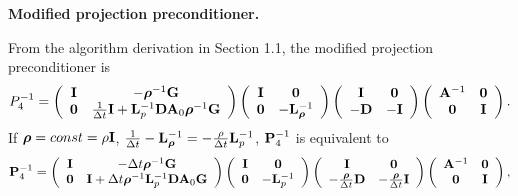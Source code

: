 \documentclass[9pt]{article}
\newcommand{\V}[1]{\boldsymbol{#1}}
\begin{document}
{\bf Modified projection preconditioner.}

From the algorithm derivation in Section 1.1, the modified projection preconditioner is
\begin{equation}\label{P4_variable_density}
P_4^{-1}=\left(\begin{array}{cc}
{\bf I} & - {\V{\rho}}^{-1}{\bf G} \\
{\bf 0}      & \frac{1}{\Delta t}{\bf I}+{\bf L}_p^{-1} {\bf D} {\bf A}_0 {\V{\rho}}^{-1} {\bf G}
\end{array}\right)
\left(\begin{array}{cc}
{\bf I}     &  {\bf 0} \\
{\bf 0}     &  -{\bf L}_{\V{\rho}}^{-1}
\end{array}\right)
\left(\begin{array}{cc}
{\bf I}      &  {\bf 0} \\
-{\bf D}     &  -{\bf I}
\end{array}\right)
\left(\begin{array}{cc}
{\bf A}^{-1}       & {\bf 0} \\
{\bf 0}            & {\bf I}
\end{array}\right).
\end{equation}
If ${\V{\rho}}=const=\rho {\bf I}$,  $\frac{1}{\Delta t} -{\bf L}_{\V{\rho}}^{-1}=-\frac{\rho}{\Delta t} {\bf L}_p^{-1}$, ${\bf P}_4^{-1}$ is equivalent to
\begin{equation}\label{Modified_Proj_Pre}
{\bf P}_4^{-1}=\left(\begin{array}{cc}
{\bf I} & -{\Delta t} {\V{\rho}}^{-1} {\bf G} \\
{\bf 0}      & {\bf I}+{\Delta t} {\V{\rho}}^{-1} {\bf L}_p^{-1} {\bf D} {\bf A}_0 {\bf G}
\end{array}\right)
\left(\begin{array}{cc}
{\bf I}     &  {\bf 0} \\
{\bf 0}     &  -{\bf L}_p^{-1}
\end{array}\right)
\left(\begin{array}{cc}
{\bf I}     &  {\bf 0} \\
-\frac{\V{\rho}}{\Delta t}{\bf D}     &  -\frac{\V{\rho}}{\Delta t}{\bf I}
\end{array}\right)
\left(\begin{array}{cc}
{\bf A}^{-1}       & {\bf 0} \\
{\bf 0}            & {\bf I}
\end{array}\right),
\end{equation}
\end{document}
